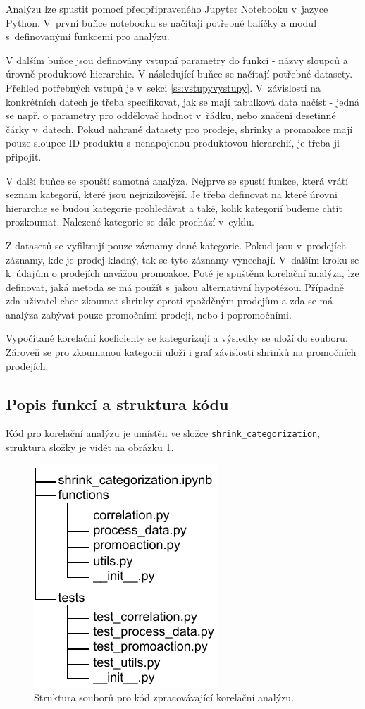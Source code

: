 Analýzu lze spustit pomocí předpřipraveného Jupyter Notebooku v~jazyce Python. V~první buňce notebooku se načítají potřebné balíčky a modul s~definovanými funkcemi pro analýzu.

V dalším buňce jsou definovány vstupní parametry do funkcí - názvy sloupců a úrovně produktové hierarchie.
V následující buňce se načítají potřebné datasety. Přehled potřebných vstupů je v~sekci \ref*{ss:vstupyvystupy}. V~závislosti na konkrétních datech je třeba specifikovat, jak se mají tabulková data načíst - jedná se např. o parametry pro oddělovač hodnot v~řádku, nebo značení desetinné čárky v~datech. Pokud nahrané datasety pro prodeje, shrinky a promoakce mají pouze sloupec ID produktu s~nenapojenou produktovou hierarchií, je třeba ji připojit.

V další buňce se spouští samotná analýza. Nejprve se spustí funkce, která vrátí seznam kategorií, které jsou nejrizikovější. Je třeba definovat na které úrovni hierarchie se budou kategorie prohledávat a také, kolik kategorií budeme chtít prozkoumat.
Nalezené kategorie se dále prochází v~cyklu.

Z datasetů se vyfiltrují pouze záznamy dané kategorie. Pokud jsou v~prodejích záznamy, kde je prodej kladný, tak se tyto záznamy vynechají. V~dalším kroku se k~údajům o prodejích navážou promoakce. Poté je spuštěna korelační analýza, lze definovat, jaká metoda se má použít s~jakou alternativní hypotézou. Případně zda uživatel chce zkoumat shrinky oproti zpožděným prodejům a zda se má analýza zabývat pouze promočními prodeji, nebo i popromočními.

Vypočítané korelační koeficienty se kategorizují a výsledky se uloží do souboru. Zároveň se pro zkoumanou kategorii uloží i graf závislosti shrinků na promočních prodejích.


\subsection{Popis funkcí a struktura kódu}

Kód pro korelační analýzu je umístěn ve složce \texttt{shrink\_categorization}, struktura složky je vidět na obrázku \ref*{obr:strukturaslozky}.

\begin{figure}[hbtp!]
    \captionsetup{justification=centering}
    \includegraphics[width=.3\textwidth]{obrazky/strukturaslozky.pdf}
    \caption{Struktura souborů pro kód zpracovávající korelační analýzu.}
    \label{obr:strukturaslozky}
\end{figure}

